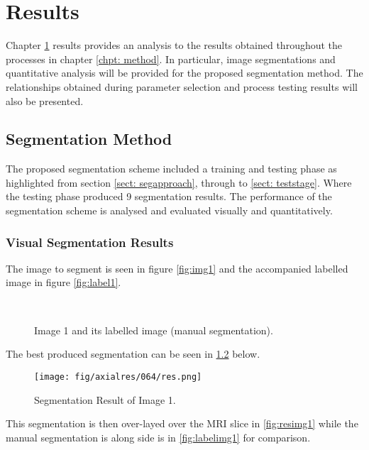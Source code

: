 \chapter{Results}
\label{chpt: results}
Chapter \ref{chpt: results} results provides an analysis to the results obtained throughout the processes in chapter \ref{chpt: method}. In particular, image segmentations and quantitative analysis  will be provided for the proposed segmentation method. The relationships obtained during parameter selection and process testing results will also be presented. 

\section{Segmentation Method}
The proposed segmentation scheme included a training and testing phase as highlighted from section \ref{sect: segapproach}, through to \ref{sect: teststage}. Where the testing phase produced 9 segmentation results. The performance of the segmentation scheme is analysed and evaluated visually and quantitatively. 

\subsection{Visual Segmentation Results}
The image to segment is seen in figure \ref{fig:img1} and the accompanied labelled image in figure \ref{fig:label1}.

\begin{figure}[H]
    \centering
    \\
    \caption{Image 1 and its labelled image (manual segmentation).}%
    \label{fig:image1}
\end{figure}

The best produced segmentation can be seen in \ref{fig:res1} below.

\begin{figure}[H]
\centering
\texttt{[image: fig/axialres/064/res.png]}
\caption{Segmentation Result of Image 1.}
\label{fig:res1}
\end{figure}

This segmentation is then over-layed over the MRI slice in \ref{fig:resimg1} while the manual segmentation is along side is in \ref{fig:labelimg1} for comparison. 

